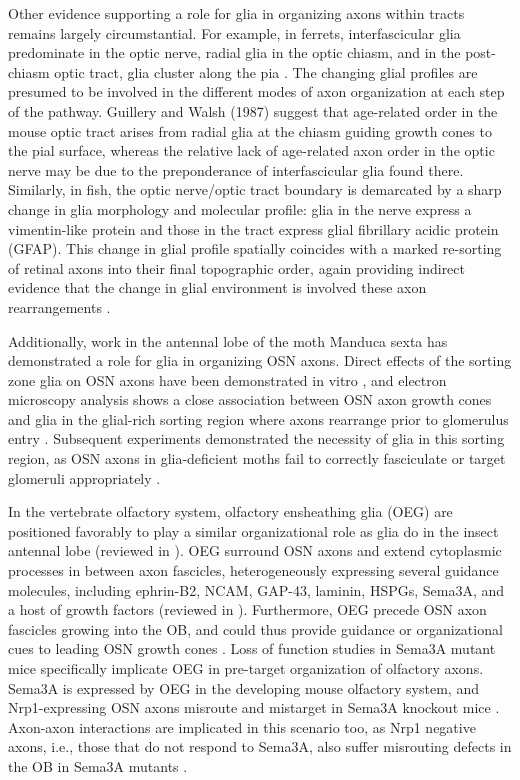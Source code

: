 Other evidence supporting a role for glia in organizing axons within tracts remains largely circumstantial. 
For example, in ferrets, interfascicular glia predominate in the optic nerve, radial glia in the optic chiasm, and in the post-chiasm optic tract, glia cluster along the pia \cite{colello1992observations,guillery1987changing}. 
The changing glial profiles are presumed to be involved in the different modes of axon organization at each step of the pathway. 
Guillery and Walsh (1987) suggest that age-related order in the mouse optic tract arises from radial glia at the chiasm guiding growth cones to the pial surface, whereas the relative lack of age-related axon order in the optic nerve may be due to the preponderance of interfascicular glia found there. 
Similarly, in fish, the optic nerve/optic tract boundary is demarcated by a sharp change in glia morphology and molecular profile: glia in the nerve express a vimentin-like protein and those in the tract express glial fibrillary acidic protein (GFAP). 
This change in glial profile spatially coincides with a marked re-sorting of retinal axons into their final topographic order, again providing indirect evidence that the change in glial environment is involved these axon rearrangements \cite{maggs1986glial}. 

Additionally, work in the antennal lobe of the moth Manduca sexta has demonstrated a role for glia in organizing OSN axons. 
Direct effects of the sorting zone glia on OSN axons have been demonstrated in vitro \cite{tucker2004vitro}, and electron microscopy analysis shows a close association between OSN axon growth cones and glia in the glial-rich sorting region where axons rearrange prior to glomerulus entry \cite{oland1998targeted}.
Subsequent experiments demonstrated the necessity of glia in this sorting region, as OSN axons in glia-deficient moths fail to correctly fasciculate or target glomeruli appropriately \cite{rossler1999development}. 

In the vertebrate olfactory system, olfactory ensheathing glia (OEG) are positioned favorably to play a similar organizational role as glia do in the insect antennal lobe (reviewed in \cite{tolbert2004bidirectional}).
OEG surround OSN axons and extend cytoplasmic processes in between axon fascicles, heterogeneously expressing several guidance molecules, including ephrin-B2, NCAM, GAP-43, laminin, HSPGs, Sema3A, and a host of growth factors (reviewed in \cite{chuah2002cellular}).
Furthermore, OEG precede OSN axon fascicles growing into the OB, and could thus provide guidance or organizational cues to leading OSN growth cones \cite{chuah2002cellular,tolbert2004bidirectional}.
Loss of function studies in Sema3A mutant mice specifically implicate OEG in pre-target organization of olfactory axons.
Sema3A is expressed by OEG in the developing mouse olfactory system, and Nrp1-expressing OSN axons misroute and mistarget in Sema3A knockout mice \cite{schwarting2000semaphorin}.
Axon-axon interactions are implicated in this scenario too, as Nrp1 negative axons, i.e., those that do not respond to Sema3A, also suffer misrouting defects in the OB in Sema3A mutants \cite{schwarting2000semaphorin}.

